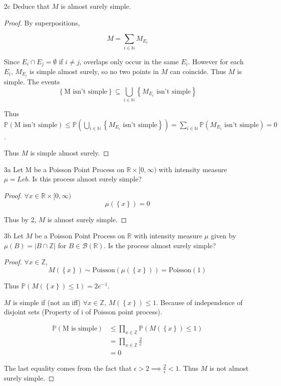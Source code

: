 \documentclass{article}
\newcommand*{\subeq}{\subseteq}
\newcommand*{\empset}{\emptyset}
\newcommand{\R}{\mathbb{R}}
\newcommand{\PR}{\mathbb{P}}
\newcommand{\Z}{\mathbb{Z}}
\newcommand{\N}{\mathbb{N}}
\newcommand{\abs}[1]{\left\lvert #1\right\rvert}
\newcommand{\Poi}[0]{\text{Poisson}}
\begin{document}
\begin{claim}{2c}\label{Claim 2c.}
    Deduce that $M$ is almost surely simple.  
\end{claim}
\begin{proof}
    By superpositions, 
    
    
    \[M = \sum_{i \in \N} M_{E_i}\]   
    
    Since $E_i \cap E_j = \empset$ if $i \neq j$, overlaps only occur in the same $E_i$. However for each $E_i$, $M_{E_i}$ is simple almost surely, so no two points in $M$ can coincide. Thus $M$ is simple. The events \[\left\{ \text{M isn't simple} \right\} \subeq \bigcup_{i \in \N} \left\{ M_{E_i} \text{ isn't simple} \right\} \] 
    
    Thus $\PR(\text{M isn't simple}) \leq \PR(\bigcup_{i \in \N} \left\{ M_{E_i} \text{ isn't simple} \right\}) = \sum_{i \in \N} \PR(\text{$M_{E_i}$ isn't simple}) = 0$.
    
    Thus $M$ is simple almost surely.  
\end{proof}


\bigskip

\begin{PROB}{3a}\label{Problem 3a.}
    Let M be a Poisson Point Process on $\R \times [0, \infty)$ with intensity measure $\mu = Leb$. Is this process almost surely simple?  
\end{PROB}
\begin{proof}
    $\forall x \in \R \times [0, \infty)$ 
    \[\mu(\left\{ x \right\}) = 0\]

    Thus by 2, $M$ is almost surely simple.  
\end{proof}

\begin{PROB}{3b}\label{Problem 3b.}
    Let $M$ be a Poisson Point Process on $\R$ with intensity measure $\mu$ given by $\mu(B) = \abs{B \cap \Z}$ for $B \in \mathcal{B}(\R)$. Is the process almost surely simple?    
\end{PROB}
\begin{proof}
    $\forall x \in \Z$, 
    \[M(\left\{ x \right\}) \sim \Poi(\mu(\left\{ x \right\})) = \Poi(1)\]
    
    Thus $\PR(M(\left\{ x \right\}) \leq 1) = 2e^{-1}$. 
    
    $M$ is simple if (not an iff) $\forall x \in \Z$, $M(\left\{ x \right\}) \leq 1$. Because of independence of disjoint sets (Property of i of Poisson point process). 
    
    \begin{align*}
        \PR(\text{M is simple}) &\leq \prod_{x \in \Z}\PR(M(\left\{ x \right\}) \leq 1) \\
        &= \prod_{x \in \Z} \frac{2}{e} \\
        &= 0
    \end{align*}

    The last equality comes from the fact that $\epsilon > 2 \implies \frac{2}{\epsilon} < 1$. Thus $M$ is not almost surely simple.   
\end{proof}
\end{document}
